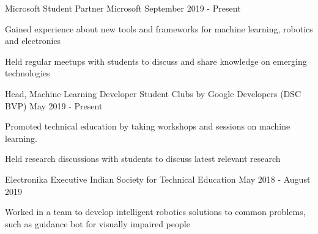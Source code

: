 
\smallskip
\begin{cventries}

  \cventry
    {Microsoft Student Partner} %
    {Microsoft} %
    {} %
    {September 2019 - Present} %
    {
      \begin{cvitems} %
        \item {Gained experience about new tools and frameworks for machine learning, robotics and electronics}
        \item {Held regular meetups with students to discuss and share knowledge on emerging technologies}
      \end{cvitems}
    }
  \cventry
    {Head, Machine Learning} %
    {Developer Student Clubs by Google Developers (DSC BVP)} %
    {} %
    {May 2019 - Present} %
    {
      \begin{cvitems} %
        \item {Promoted technical education by taking workshops and sessions on machine learning.}
        \item {Held research discussions with students to discuss latest relevant research}
      \end{cvitems}
    }
    \smallskip
    \smallskip
  \cventry
    {Electronika Executive} %
    {Indian Society for Technical Education} %
    {} %
    {May 2018 - August 2019} %
    {
      \begin{cvitems} %
        \item {Worked in a team to develop intelligent robotics solutions to common problems, such as guidance bot for visually impaired people}
      \end{cvitems}
    }

\end{cventries}
